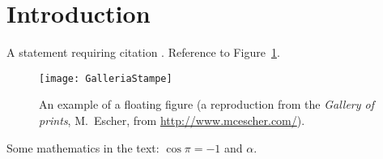\section{Introduction}


A statement requiring citation \cite{Figueredo:2009dg}. Reference to Figure~\ref{fig:gallery}.\\

\begin{figure}[tb]
    \centering
    \texttt{[image: GalleriaStampe]}
    \caption[An example of a floating figure]{An example of a floating figure (a reproduction from the \emph{Gallery of prints}, M.~Escher, from \url{http://www.mcescher.com/}).} %
    \label{fig:gallery}
\end{figure}


\lipsum[1-3] %

Some mathematics in the text: $\cos\pi=-1$ and $\alpha$.
